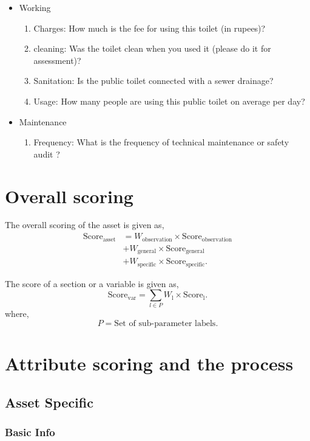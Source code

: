 \documentclass[oneside,twocolumn]{article}
\newcommand{\tsub}[2]{\text{#1}_{\text{#2}}}
\newcommand{\tsubb}[2]{#1_{\text{#2}}}
\begin{document}
\begin{itemize}
\begin{itemize}
\item Working
\begin{enumerate}
\item Charges: How much is the fee for using this toilet (in rupees)?
\item cleaning: Was the toilet clean when you used it (please do it for assessment)?
\item Sanitation: Is the public toilet connected with a sewer drainage?
\item Usage: How many people are using this public toilet on average per day?
\end{enumerate}

\item Maintenance
\begin{enumerate}
\item Frequency: What is the frequency of technical maintenance or safety audit ?
\end{enumerate}

\end{itemize}

    \end{itemize}
\section{Overall scoring}
The overall scoring of the asset is given as,
\begin{align*}
	\tsub{Score}{asset} &= \tsubb{W}{observation} \times \tsub{Score}{observation} \\
	&+ \tsubb{W}{general} \times \tsub{Score}{general} \\
	&+ \tsubb{W}{specific} \times \tsub{Score}{specific}.
\end{align*}

The score of a section or a variable is given as,
\[
	\tsub{Score}{var} = \sum_{l \in P} \tsubb{W}{l} \times \tsub{Score}{l}.
\]
where,
\[
	P = \text{Set of sub-parameter labels.}
\]
\section{Attribute scoring and the
process}
\subsection{Asset Specific}
\subsubsection{Basic Info}
\end{document}
